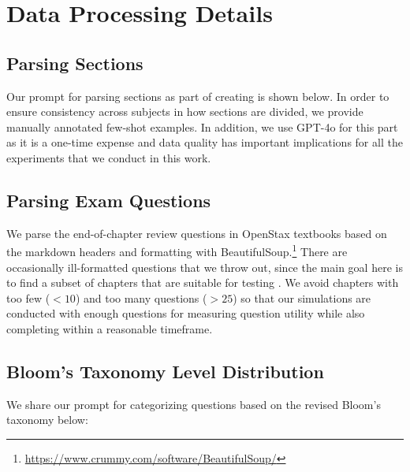 \section{Data Processing Details}
\label{appendix:data_processing}

\subsection{Parsing Sections}
\label{appdx:parsing-sections}

Our prompt for parsing sections as part of creating \ourdata is shown below. 
In order to ensure consistency across subjects in how sections are divided, we provide manually annotated few-shot examples. 
In addition, we use GPT-4o for this part as it is a one-time expense and data quality has important implications for all the experiments that we conduct in this work.  



\subsection{Parsing Exam Questions}
\label{appdx:parsing-exam-questions}

We parse the end-of-chapter review questions in OpenStax textbooks based on the markdown headers and formatting with BeautifulSoup.\footnote{\url{https://www.crummy.com/software/BeautifulSoup/}}
There are occasionally ill-formatted questions that we throw out, since the main goal here is to find a subset of chapters that are suitable for testing \ours. 
We avoid chapters with too few ($<10$) and too many questions ($>25$) so that our simulations are conducted with enough questions for measuring question utility while also completing within a reasonable timeframe.  

\subsection{Bloom's Taxonomy Level Distribution}
\label{appdx:bloom-taxonomy-level-distribution}
We share our prompt for categorizing questions based on the revised Bloom's taxonomy below: 



